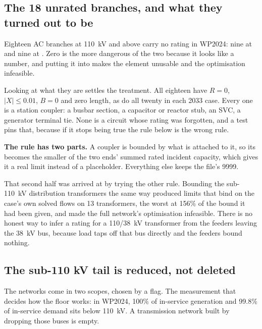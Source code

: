 \documentclass[11pt,a4paper]{article}
\begin{document}

\subsection{The 18 unrated branches, and what they turned out to be}

Eighteen AC branches at 110~kV and above carry no rating in WP2024: nine at
 and nine at . Zero is the more dangerous of
the two because it looks like a number, and putting it into  makes
the element unusable and the optimisation infeasible.

Looking at what they are settles the treatment. All eighteen have $R = 0$,
$|X| \leq 0.01$, $B = 0$ and zero length, as do all twenty in each 2033 case.
Every one is a station coupler: a busbar section, a capacitor or reactor stub,
an SVC, a generator terminal tie. None is a circuit whose rating was forgotten,
and a test pins that, because if it stops being true the rule below is the
wrong rule.

\textbf{The rule has two parts.} A coupler is bounded by what is attached to
it, so its  becomes the smaller of the two ends' summed rated
incident capacity, which gives it a real limit instead of a placeholder. Everything
else keeps the file's 9999.

That second half was arrived at by trying the other rule. Bounding the
sub-110~kV distribution transformers the same way produced limits that bind on
the case's own solved flows on 13 transformers, the worst at 156\% of the bound
it had been given, and made the full network's optimisation infeasible. There
is no honest way to infer a rating for a 110/38~kV transformer from the feeders
leaving the 38~kV bus, because load taps off that bus directly and the feeders
bound nothing.


\subsection{The sub-110 kV tail is reduced, not deleted}

The networks come in two scopes, chosen by a  flag. The
measurement that decides how the floor works: in WP2024, 100\% of in-service
generation and 99.8\% of in-service demand sits below 110~kV. A transmission
network built by dropping those buses is empty.
\end{document}
